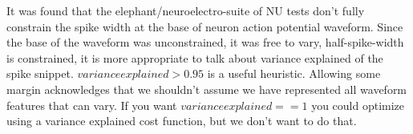 It was found that the elephant/neuroelectro-suite of NU tests don't fully constrain the spike width at the base of neuron action potential waveform. Since the base of the waveform was unconstrained, it was free to vary, half-spike-width is constrained, it is more appropriate to talk about variance explained of the spike snippet. $variance explained>0.95$ is a useful heuristic. Allowing some margin acknowledges that we shouldn't assume we have represented all waveform features that can vary. If you want $variance explained==1$   you could optimize using a variance explained cost function, but we don't want to do that.